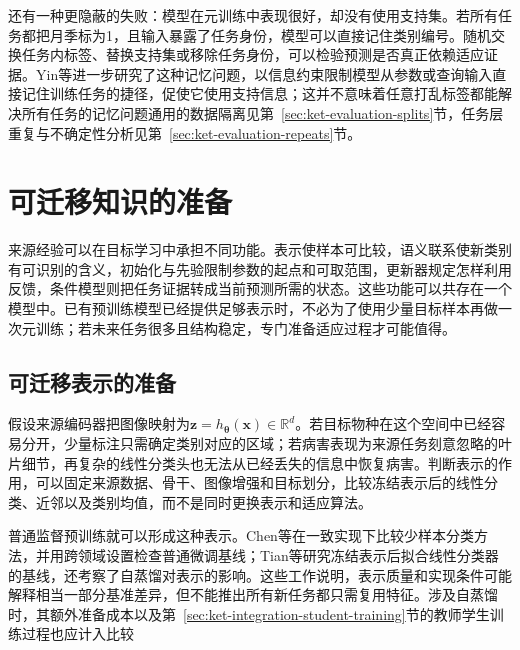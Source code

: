 还有一种更隐蔽的失败：模型在元训练中表现很好，却没有使用支持集。若所有任务都把月季标为1，且输入暴露了任务身份，模型可以直接记住类别编号。随机交换任务内标签、替换支持集或移除任务身份，可以检验预测是否真正依赖适应证据。Yin等进一步研究了这种记忆问题，以信息约束限制模型从参数或查询输入直接记住训练任务的捷径，促使它使用支持信息；这并不意味着任意打乱标签都能解决所有任务的记忆问题通用的数据隔离见第~\ref{sec:ket-evaluation-splits}节，任务层重复与不确定性分析见第~\ref{sec:ket-evaluation-repeats}节。

\section{可迁移知识的准备}
\label{sec:ket-transfer-preparation}

来源经验可以在目标学习中承担不同功能。表示使样本可比较，语义联系使新类别有可识别的含义，初始化与先验限制参数的起点和可取范围，更新器规定怎样利用反馈，条件模型则把任务证据转成当前预测所需的状态。这些功能可以共存在一个模型中。已有预训练模型已经提供足够表示时，不必为了使用少量目标样本再做一次元训练；若未来任务很多且结构稳定，专门准备适应过程才可能值得。

\subsection{可迁移表示的准备}
\label{sec:ket-transfer-representation}

假设来源编码器把图像映射为$\bm z=h_{\bm{\theta}}(\bm x)\in\mathbb R^d$。若目标物种在这个空间中已经容易分开，少量标注只需确定类别对应的区域；若病害表现为来源任务刻意忽略的叶片细节，再复杂的线性分类头也无法从已经丢失的信息中恢复病害。判断表示的作用，可以固定来源数据、骨干、图像增强和目标划分，比较冻结表示后的线性分类、近邻以及类别均值，而不是同时更换表示和适应算法。

普通监督预训练就可以形成这种表示。Chen等在一致实现下比较少样本分类方法，并用跨领域设置检查普通微调基线；Tian等研究冻结表示后拟合线性分类器的基线，还考察了自蒸馏对表示的影响。这些工作说明，表示质量和实现条件可能解释相当一部分基准差异，但不能推出所有新任务都只需复用特征。涉及自蒸馏时，其额外准备成本以及第~\ref{sec:ket-integration-student-training}节的教师学生训练过程也应计入比较


